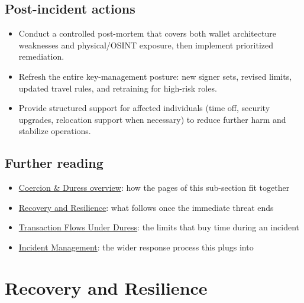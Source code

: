 \section{Post-incident actions}\label{post-incident-actions}

\begin{itemize}
\tightlist
\item
  Conduct a controlled post-mortem that covers both wallet architecture weaknesses and physical/OSINT exposure, then implement prioritized remediation.
\item
  Refresh the entire key-management posture: new signer sets, revised limits, updated travel rules, and retraining for high-risk roles.
\item
  Provide structured support for affected individuals (time off, security upgrades, relocation support when necessary) to reduce further harm and stabilize operations.
\end{itemize}

\section{Further reading}\label{further-reading-9}

\begin{itemize}
\tightlist
\item
  \href{https://frameworks.securityalliance.dev/physical-security/coercion-and-duress/overview}{Coercion \& Duress overview}: how the pages of this sub-section fit together
\item
  \href{https://frameworks.securityalliance.dev/physical-security/coercion-and-duress/recovery-and-resilience}{Recovery and Resilience}: what follows once the immediate threat ends
\item
  \href{https://frameworks.securityalliance.dev/physical-security/coercion-and-duress/transaction-flows-under-duress}{Transaction Flows Under Duress}: the limits that buy time during an incident
\item
  \href{https://frameworks.securityalliance.dev/incident-management/overview}{Incident Management}: the wider response process this plugs into
\end{itemize}


\chapter{Recovery and Resilience}\label{recovery-and-resilience}

